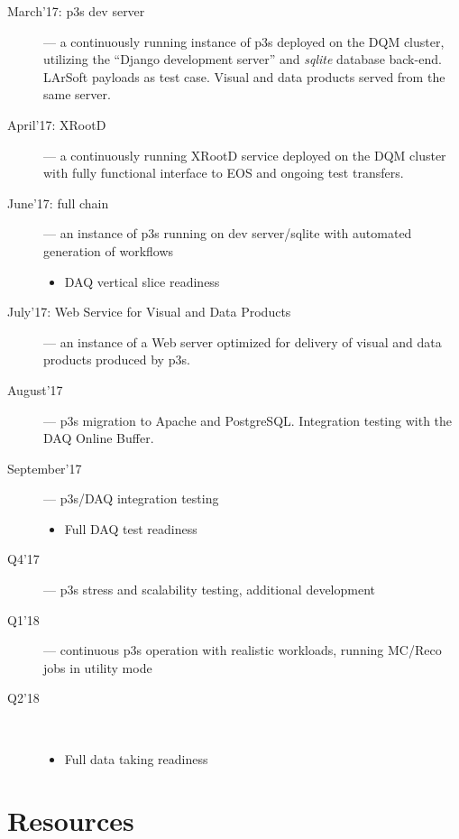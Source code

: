 \documentclass[pdftex,12pt,letter]{article}
\begin{document}
\begin{description}

\item[March'17: p3s dev server] --- a continuously running instance of p3s deployed on the DQM cluster,
utilizing the ``Django development server'' and \textit{sqlite} database back-end. LArSoft payloads as
test case. Visual and data products served from the same server.

\item[April'17: XRootD] --- a continuously running XRootD service deployed on the DQM cluster with
fully functional interface to EOS and ongoing test transfers.

\item[June'17: full chain] --- an instance of p3s running on dev server/sqlite with automated
generation of workflows
\begin{itemize}
\item DAQ vertical slice readiness
\end{itemize}

\item[July'17: Web Service for Visual and Data Products] --- an instance of a Web server optimized
for delivery of visual and data products produced by p3s.

\item[August'17] --- p3s migration to Apache and PostgreSQL. Integration testing with the
DAQ Online Buffer.

\item[September'17] --- p3s/DAQ integration testing
\begin{itemize}
\item Full DAQ test readiness
\end{itemize}

\item[Q4'17] --- p3s stress and scalability testing, additional development

\item[Q1'18] --- continuous p3s operation with realistic workloads, running
MC/Reco jobs in utility mode

\item[Q2'18]\ 
\begin{itemize}
\item Full data taking readiness
\end{itemize}

\end{description}


\section{Resources}
\end{document}
